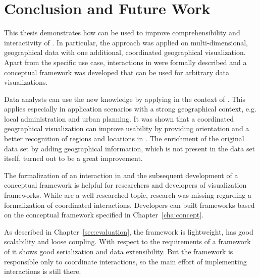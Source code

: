 \chapter{Conclusion and Future Work}\label{sec:conclusion}

This thesis demonstrates how \cmvs{} can be used to improve comprehensibility and interactivity of \tmaps{}.
In particular, the approach was applied on multi-dimensional, geographical data with one additional, coordinated geographical visualization.
Apart from the specific use case, interactions in \cmvs{} were formally described and a conceptual framework was developed that can be used for arbitrary data visualizations.

Data analysts can use the new knowledge by applying \tmaps{} in the context of \dss{}.
This applies especially in application scenarios with a strong geographical context, e.g. local administration and urban planning.
It was shown that a coordinated geographical visualization can improve usability by providing orientation and a better recognition of regions and locations in \tmaps{}.
The enrichment of the original data set by adding geographical information, which is not present in the data set itself, turned out to be a great improvement.

The formalization of an interaction in \cmvs{} and the subsequent development of a conceptual framework is helpful for researchers and developers of visualization frameworks.
While \cmvs{} are a well researched topic, research was missing regarding a formalization of coordinated interactions.
Developers can built frameworks based on the conceptual framework specified in Chapter~\ref{cha:concept}.

As described in Chapter~\ref{sec:evaluation}, the framework is lightweight, has good scalability and loose coupling.
With respect to the requirements of a framework of \cmvs{} it shows good serialization and data extensibility.
But the framework is responsible only to coordinate interactions, so the main effort of implementing interactions is still there.





